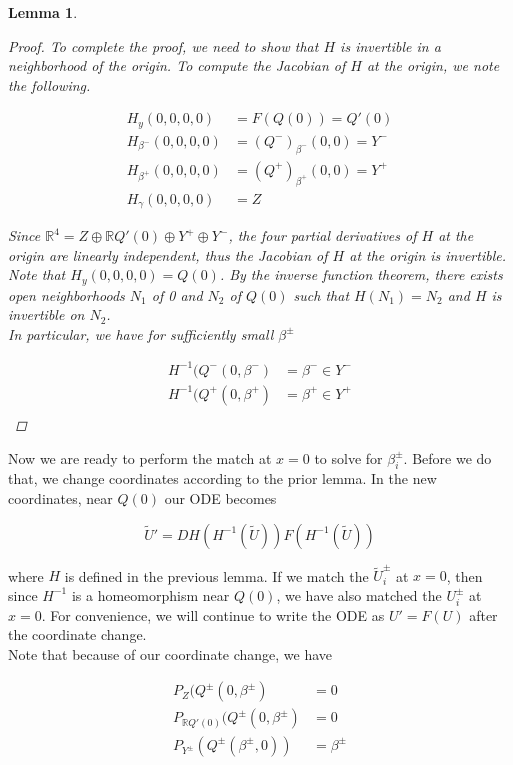 \documentclass[12pt]{article}
\def\R{{\mathbb R}}
\newtheorem{lemma}{Lemma}
\begin{document}
\begin{lemma}
\begin{proof}
To complete the proof, we need to show that $H$ is invertible in a neighborhood of the origin. To compute the Jacobian of $H$ at the origin, we note the following.

\begin{align*}
H_y(0, 0, 0, 0) &= F(Q(0)) = Q'(0) \\
H_{\beta^-}(0, 0, 0, 0) &= (Q^-)_{\beta^-}(0,0) = Y^- \\
H_{\beta^+}(0, 0, 0, 0) &= (Q^+)_{\beta^+}(0,0) = Y^+ \\
H_{\gamma}(0, 0, 0, 0) &= Z
\end{align*}

Since $\R^4 = Z \oplus \R Q'(0) \oplus Y^+ \oplus Y^-$, the four partial derivatives of $H$ at the origin are linearly independent, thus the Jacobian of $H$ at the origin is invertible. Note that $H_y(0, 0, 0, 0) = Q(0)$. By the inverse function theorem, there exists open neighborhoods $N_1$ of 0 and $N_2$ of $Q(0)$ such that $H(N_1) = N_2$ and $H$ is invertible on $N_2$. \\

In particular, we have for sufficiently small $\beta^\pm$

\begin{align*}
H^{-1}(Q^-(0, \beta^-) &= \beta^- \in Y^- \\
H^{-1}(Q^+(0, \beta^+) &= \beta^+ \in Y^+ \\
\end{align*}

\end{proof}
\end{lemma}

Now we are ready to perform the match at $x = 0$ to solve for $\beta_i^\pm$. Before we do that, we change coordinates according to the prior lemma. In the new coordinates, near $Q(0)$ our ODE becomes

\begin{equation}
\tilde{U}' = DH(H^{-1}(\tilde{U})) F( H^{-1}(\tilde{U}) )
\end{equation}

where $H$ is defined in the previous lemma. If we match the $\tilde{U}_i^\pm$ at $x = 0$, then since $H^{-1}$ is a homeomorphism near $Q(0)$, we have also matched the $U_i^\pm$ at $x = 0$. For convenience, we will continue to write the ODE as $U' = F(U)$ after the coordinate change.\\

Note that because of our coordinate change, we have

\begin{align*}
P_Z(Q^\pm(0, \beta^\pm) &= 0 \\
P_{\R Q'(0)}(Q^\pm(0, \beta^\pm) &= 0 \\
P_{Y^\pm}(Q^\pm(\beta^\pm, 0)) &= \beta^\pm
\end{align*}
\end{document}
